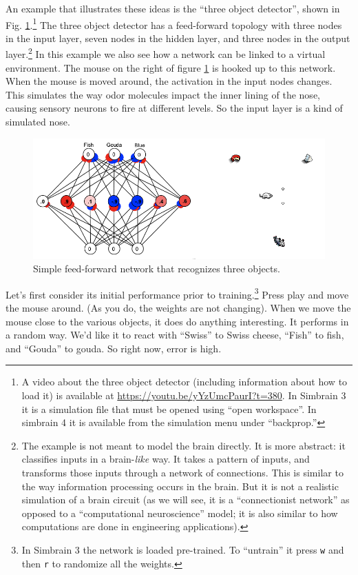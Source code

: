 An example that illustrates these ideas is the ``three object detector'',  shown in Fig. \ref{3ObjectClassifier}.\footnote{A video about the three object detector (including information about how to load it) is available at \url{https://youtu.be/yYzUmcPaurI?t=380}. In Simbrain 3 it is a simulation file that must be opened using ``open workspace''. In simbrain 4 it is available from the simulation menu under ``backprop.''} The three object detector has a feed-forward topology with three nodes in the input layer, seven nodes in the hidden layer, and three nodes in the output layer.\footnote{The example is not meant to model the brain directly. It is more abstract:  it classifies inputs in a  brain-\emph{like} way. It takes a pattern of inputs, and transforms those inputs through a network of connections. This is similar to the way information processing occurs in the brain. But it is not a realistic simulation of a brain circuit (as we will see, it is a ``connectionist network'' as opposed to a ``computational neuroscience'' model; it is also similar to how computations are done in engineering applications).} In this example we also see how a network can be linked to a virtual environment. The mouse on the right of figure \ref{3ObjectClassifier} is hooked up to this network. When the mouse is moved around, the activation in the input nodes changes. This simulates the way odor molecules impact the inner lining of the nose, causing sensory neurons to fire at different levels. So the input layer is a kind of simulated nose. 
\begin{figure}[h]
\centering
\includegraphics[scale=.4]{./images/3Node_World.png}
\caption[Simbrain screenshot.]{Simple feed-forward network that recognizes three objects.}
\label{3ObjectClassifier}
\end{figure}

Let's first consider its initial performance prior to training.\footnote{In Simbrain 3 the network is loaded pre-trained. To ``untrain'' it  press \texttt{w} and then \texttt{r} to randomize all the weights.} Press play and move the mouse around. (As you do, the weights are not changing). When we move the mouse close to the various objects, it does do anything interesting. It performs in a random way.  We'd like it to react with ``Swiss'' to Swiss cheese, ``Fish'' to fish, and ``Gouda'' to gouda.  So right now, error is high. 

